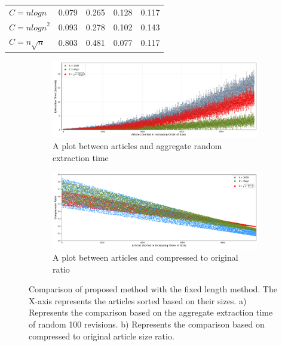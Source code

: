 \documentclass[acmsmall]{acmart}
\begin{document}
\begin{table}[t]
{\begin{tabular}{lcccc}
\rowcolor[HTML]{DAE8FC} 
$C = nlogn$             & 0.079                      & 0.265                      & 0.128                       & 0.117                       \\ [0.1cm]
$C = n{logn}^2$         & 0.093                      & 0.278                      & 0.102                       & 0.143                       \\ [0.1cm]
$C = n\sqrt{n}$             & 0.803                      & 0.481                      & 0.077                       & 0.117 \\ \hline
\end{tabular}}
\end{table}


\begin{figure}[htbp]
    \centering

    \begin{subfigure}{\linewidth}
        \centering
        \includegraphics[width=0.9\linewidth]{extraction.png}
        \caption{A plot between articles and aggregate random extraction time}
        \label{fig:top}
    \end{subfigure}

    \vspace{1em}  %

    \begin{subfigure}{\linewidth}
        \centering
        \includegraphics[width=0.9\linewidth]{compression.png}
        \caption{A plot between articles and compressed to original ratio}
        \label{fig:bottom}
    \end{subfigure}

    \caption{Comparison of proposed method with the fixed length method. The X-axis represents the articles sorted based on their sizes. a) Represents the comparison based on the aggregate extraction time of random 100 revisions. b) Represents the comparison based on compressed to original article size ratio.}
    \label{fig:combined}
\end{figure}
\end{document}
